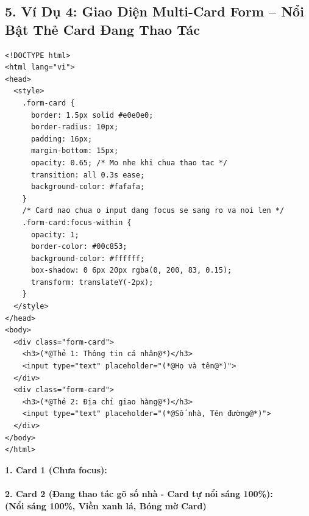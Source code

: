 \documentclass[11pt,oneside]{book}
\begin{document}
\subsection{5. Ví Dụ 4: Giao Diện Multi-Card Form -- Nổi Bật Thẻ Card Đang Thao Tác}

\begin{codeWindow}
\begin{lstlisting}[language=HTML5]
<!DOCTYPE html>
<html lang="vi">
<head>
  <style>
    .form-card {
      border: 1.5px solid #e0e0e0;
      border-radius: 10px;
      padding: 16px;
      margin-bottom: 15px;
      opacity: 0.65; /* Mo nhe khi chua thao tac */
      transition: all 0.3s ease;
      background-color: #fafafa;
    }
    /* Card nao chua o input dang focus se sang ro va noi len */
    .form-card:focus-within {
      opacity: 1;
      border-color: #00c853;
      background-color: #ffffff;
      box-shadow: 0 6px 20px rgba(0, 200, 83, 0.15);
      transform: translateY(-2px);
    }
  </style>
</head>
<body>
  <div class="form-card">
    <h3>(*@Thẻ 1: Thông tin cá nhân@*)</h3>
    <input type="text" placeholder="(*@Họ và tên@*)">
  </div>
  <div class="form-card">
    <h3>(*@Thẻ 2: Địa chỉ giao hàng@*)</h3>
    <input type="text" placeholder="(*@Số nhà, Tên đường@*)">
  </div>
</body>
</html>
\end{lstlisting}
\end{codeWindow}

\begin{browserWindow}
\sffamily\small
\textbf{1. Card 1 (Chưa focus):}\\[2pt]
\\[8pt]
\textbf{2. Card 2 (Đang thao tác gõ số nhà - Card tự nổi sáng 100\%):}\\[2pt]
 \quad \textcolor{green!70!black}{\bfseries (Nổi sáng 100\%, Viền xanh lá, Bóng mờ Card)}
\end{browserWindow}
\end{document}
